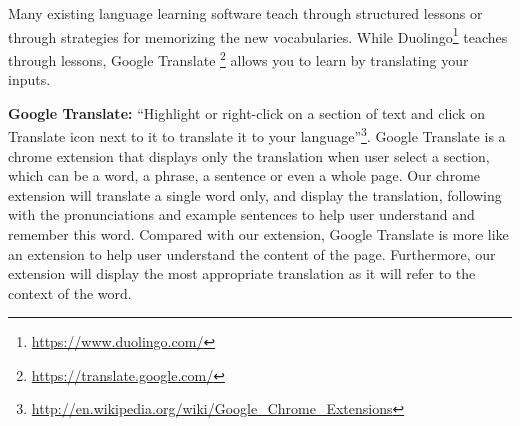 Many existing language learning software teach through structured lessons 
or through strategies for memorizing the new vocabularies. 
While Duolingo\footnote{\url{https://www.duolingo.com/}} teaches through lessons, 
Google Translate \footnote{\url{https://translate.google.com/}} allows you to learn by 
translating your inputs. 

\textbf{Google Translate:} ``Highlight or right-click on a section of text and click
on Translate icon next to it to translate it to your 
language''\footnote{\url{http://en.wikipedia.org/wiki/Google_Chrome_Extensions}}. 
Google Translate is a chrome extension that displays only the translation when user 
select a section, which can be a word, a phrase, a sentence or even a whole page. 
Our chrome extension will translate a single word only, and display the translation,
following with the pronunciations and example sentences to help user understand and 
remember this word. Compared with our extension, Google Translate is more like an extension 
to help user understand the content of the page. Furthermore, our extension will display 
the most appropriate translation as it will refer to the context of the word.

